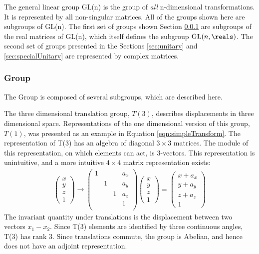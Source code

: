 The general linear group GL(n) is the group of \emph{all} n-dimensional transformations.
It is represented by all non-singular \nxn matrices.
All of the groups shown here are subgroups of GL(n).
The first set of groups shown Section \ref{sec:poincare} are subgroups of the real \nxn matrices of GL(n), which itself defines the subgroup $\text{GL}(n,\reals)$.
The second set of groups presented in the Sections \ref{sec:unitary} and \ref{sec:specialUnitary} are represented by complex matrices.

\subsubsection{\poincare Group}\label{sec:poincare}


The \poincare Group is composed of several subgroups, which are described here.

The three dimensional translation group, $T(3)$, describes displacements in three dimensional space.
Representations of the one dimensional version of this group, $T(1)$, was presented as an example in Equation \ref{eqn:simpleTransform}.
The representation of T(3) has an algebra of diagonal $3\times3$ matrices. \check
The module of this representation, on which elements can act, is 3-vectors.
This representation is unintuitive, and a more intuitive $4\times4$ matrix representation exists:
\begin{equation}\begin{split}
\begin{pmatrix}
x\\y\\z\\1
\end{pmatrix}\to
\begin{pmatrix}
1& & & a_x \\
 &1& & a_y \\
 & &1& a_z \\
 & & & 1   \\
\end{pmatrix}
\begin{pmatrix}
x\\y\\z\\1
\end{pmatrix}=
\begin{pmatrix}
x+a_x\\y+a_y\\z+a_z\\1
\end{pmatrix}
\end{split}\end{equation} 
The invariant quantity under translations is the displacement between two vectors $x_1-x_2$.
Since T(3) elements are identified by three continuous angles, T(3) has rank 3.
Since translations commute, the group is Abelian, and hence does not have an adjoint representation.

